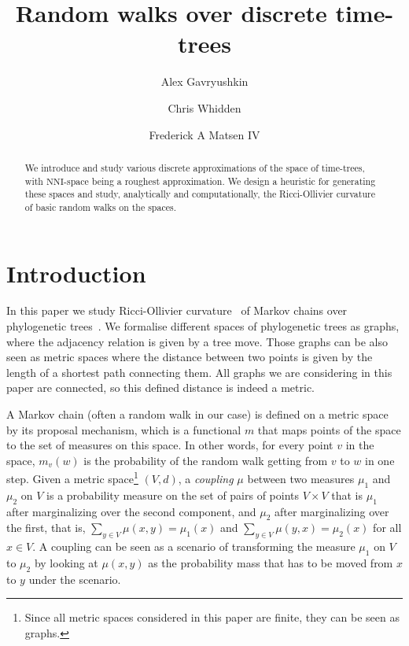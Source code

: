 \documentclass{amsart}
\newcommand{\nni}{\mathrm{NNI}}
\begin{document}
\title{Random walks over discrete time-trees}

\author{Alex Gavryushkin}
\address{Department of Computer Science, The University of Auckland, New Zealand}

\author{Chris Whidden}
\address{Program in Computational Biology, Fred Hutchinson Cancer Research Center, Seattle, WA 98109}

\author{Frederick A Matsen IV}


\begin{abstract}
We introduce and study various discrete approximations of the space of time-trees, with $\nni$-space being a roughest approximation.
We design a heuristic for generating these spaces and study, analytically and computationally, the Ricci-Ollivier curvature of basic random walks on the spaces.
\end{abstract}

\maketitle

\section{Introduction}

In this paper we study Ricci-Ollivier curvature~\cite{Ollivier2009-cj} of Markov chains over phylogenetic trees~\cite{Semple2003-nj}.
We formalise different spaces of phylogenetic trees as graphs, where the adjacency relation is given by a tree move.
Those graphs can be also seen as metric spaces where the distance between two points is given by the length of a shortest path connecting them.
All graphs we are considering in this paper are connected, so this defined distance is indeed a metric.

A Markov chain (often a random walk in our case) is defined on a metric space by its proposal mechanism, which is a functional $m$ that maps points of the space to the set of measures on this space.
In other words, for every point $v$ in the space, $m_v(w)$ is the probability of the random walk getting from $v$ to $w$ in one step.
Given a metric space\footnote{Since all metric spaces considered in this paper are finite, they can be seen as graphs.}
$(V,d)$, a \emph{coupling} $\mu$ between two measures $\mu_1$ and $\mu_2$ on $V$ is a probability measure on the set of pairs of points $V \times V$ that is $\mu_1$ after marginalizing over the second component, and $\mu_2$ after marginalizing over the first, that is, $\sum\limits_{y \in V}\mu(x,y) = \mu_1(x)$ and $\sum\limits_{y \in V}\mu(y,x) = \mu_2(x)$ for all $x \in V$.
A coupling can be seen as a scenario of transforming the measure $\mu_1$ on $V$ to $\mu_2$ by looking at $\mu(x,y)$ as the probability mass that has to be moved from $x$ to $y$ under the scenario.
\end{document}

